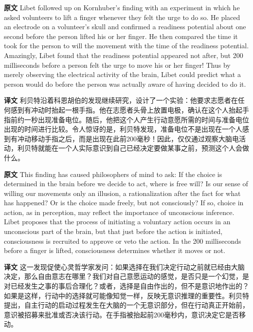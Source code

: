 \documentclass[UTF8,zihao=-4]{ctexart}
\newcommand{\BodyFont}{\fontsize{10.5pt}{15.5pt}\selectfont}
\newcommand{\origlabel}{\textbf{原文}\quad}
\newcommand{\translabel}{\textbf{译文}\quad}
\newenvironment{enblock}{\par\noindent\begingroup\BodyFont\origlabel}{\par\endgroup}
\newenvironment{zhblock}{\par\noindent\begingroup\BodyFont\translabel}{\par\endgroup\vspace{0.35em}}
\begin{document}
\begin{enblock}
Libet followed up on Kornhuber's finding with an experiment in which he asked volunteers to lift a finger whenever they felt the urge to do so. He placed an electrode on a volunteer's skull and confirmed a readiness potential about one second before the person lifted his or her finger. He then compared the time it took for the person to will the movement with the time of the readiness potential. Amazingly, Libet found that the readiness potential appeared not after, but 200 milliseconds before a person felt the urge to move his or her finger! Thus by merely observing the electrical activity of the brain, Libet could predict what a person would do before the person was actually aware of having decided to do it.
\end{enblock}
\begin{zhblock}
利贝特沿着科恩胡伯的发现继续研究，设计了一个实验：他要求志愿者在任何感到有冲动时抬起一根手指。他在志愿者头骨上放置电极，确认在这个人抬起手指前约一秒出现准备电位。随后，他把这个人产生行动意愿所需的时间与准备电位出现的时间进行比较。令人惊讶的是，利贝特发现，准备电位不是出现在一个人感到有冲动移动手指之后，而是出现在此前200毫秒！因此，仅仅通过观察大脑电活动，利贝特就能在一个人实际意识到自己已经决定要做某事之前，预测这个人会做什么。\end{zhblock}

\begin{enblock}
This finding has caused philosophers of mind to ask: If the choice is determined in the brain before we decide to act, where is free will? Is our sense of willing our movements only an illusion, a rationalization after the fact for what has happened? Or is the choice made freely, but not consciously? If so, choice in action, as in perception, may reflect the importance of unconscious inference. Libet proposes that the process of initiating a voluntary action occurs in an unconscious part of the brain, but that just before the action is initiated, consciousness is recruited to approve or veto the action. In the 200 milliseconds before a finger is lifted, consciousness determines whether it moves or not.
\end{enblock}
\begin{zhblock}
这一发现促使心灵哲学家发问：如果选择在我们决定行动之前就已经由大脑决定，那么自由意志在哪里？我们对自己意愿运动的感觉，是否只是一个幻觉，是对已经发生之事的事后合理化？或者，选择是自由作出的，但不是意识地作出的？如果是这样，行动中的选择就可能像知觉一样，反映无意识推理的重要性。利贝特提出，自主行动的启动过程发生在大脑的一个无意识部分，但在行动真正开始前，意识被招募来批准或否决该行动。在手指被抬起前200毫秒内，意识决定它是否移动。\end{zhblock}
\end{document}
